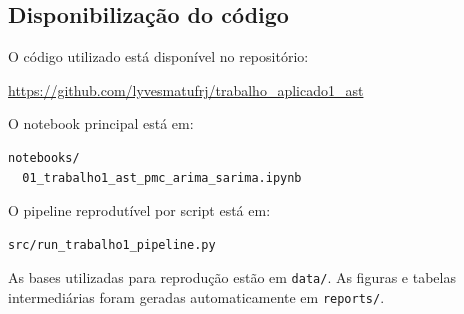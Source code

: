 \subsection{Disponibilização do código}

O código utilizado está disponível no repositório:

\begin{center}
\url{https://github.com/lyvesmatufrj/trabalho_aplicado1_ast}
\end{center}

O notebook principal está em:

\begin{verbatim}
notebooks/
  01_trabalho1_ast_pmc_arima_sarima.ipynb
\end{verbatim}

O pipeline reprodutível por script está em:

\begin{verbatim}
src/run_trabalho1_pipeline.py
\end{verbatim}

As bases utilizadas para reprodução estão em \texttt{data/}. As figuras e tabelas intermediárias foram geradas automaticamente em \texttt{reports/}.
